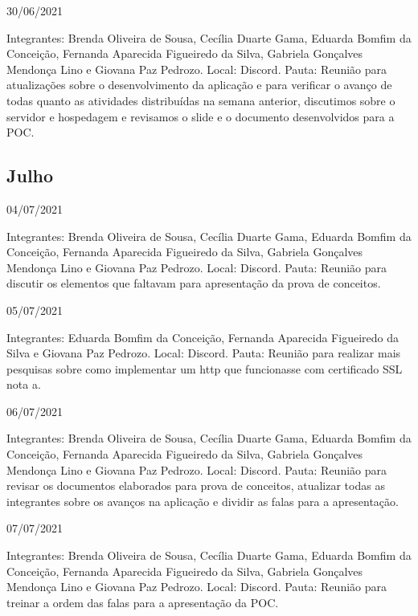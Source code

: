 \begin{apendicesenv}
\begin{flushleft}
30/06/2021

Integrantes: Brenda Oliveira de Sousa, Cecília Duarte Gama, Eduarda Bomfim da Conceição, Fernanda Aparecida Figueiredo da Silva, Gabriela Gonçalves Mendonça Lino e Giovana Paz Pedrozo.
\newline
Local: \gls{Discord}.
\newline
Pauta: Reunião para atualizações sobre o desenvolvimento da aplicação e para verificar o avanço de todas quanto as atividades distribuídas na semana anterior, discutimos sobre o servidor e hospedagem e revisamos o slide e o documento desenvolvidos para a \ac{POC}.
\end{flushleft}

\begin{flushleft}
 \section{Julho}
 04/07/2021 

Integrantes: Brenda Oliveira de Sousa, Cecília Duarte Gama, Eduarda Bomfim da Conceição, Fernanda Aparecida Figueiredo da Silva, Gabriela Gonçalves Mendonça Lino e Giovana Paz Pedrozo.
\newline
Local: \gls{Discord}.
\newline
Pauta: Reunião para discutir os elementos que faltavam para apresentação da prova de conceitos.

05/07/2021

Integrantes: Eduarda Bomfim da Conceição, Fernanda Aparecida Figueiredo da Silva e Giovana Paz Pedrozo.
\newline
Local: \gls{Discord}.
\newline
Pauta: Reunião para realizar mais pesquisas sobre como implementar um http que funcionasse com certificado \ac{SSL} nota a.

06/07/2021 

Integrantes: Brenda Oliveira de Sousa, Cecília Duarte Gama, Eduarda Bomfim da Conceição, Fernanda Aparecida Figueiredo da Silva, Gabriela Gonçalves Mendonça Lino e Giovana Paz Pedrozo.
\newline
Local: \gls{Discord}.
\newline
Pauta: Reunião para revisar os documentos elaborados para prova de conceitos, atualizar todas as integrantes sobre os avanços na aplicação e dividir as falas para a apresentação.

07/07/2021

Integrantes: Brenda Oliveira de Sousa, Cecília Duarte Gama, Eduarda Bomfim da Conceição, Fernanda Aparecida Figueiredo da Silva, Gabriela Gonçalves Mendonça Lino e Giovana Paz Pedrozo.
\newline
Local: \gls{Discord}.
\newline
Pauta: Reunião para treinar a ordem das falas para a apresentação da \ac{POC}.


\end{flushleft}
\end{apendicesenv}
